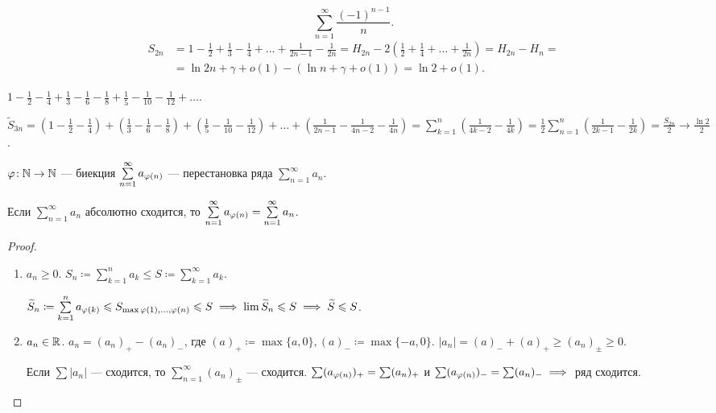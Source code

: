 \begin{example}
    \[
           \sum\limits_{n=1}^\infty \frac{(-1)^{n-1}}{n}
    .\] 
   \begin{align*}
       S_{2n}&=1-\frac{1}{2} + \frac{1}{3} - \frac{1}{4} + \ldots + \frac{1}{2n-1} - \frac{1}{2n} = H_{2n} - 2(\frac{1}{2} + \frac{1}{4} + \ldots + \frac{1}{2n}) = H_{2n} - H_n = \\ 
          &= \ln 2n+ \gamma + o(1) - (\ln n + \gamma + o(1)) = \ln 2 + o(1).
   \end{align*}
\end{example}
\begin{example}
    $1 - \frac{1}{2} - \frac{1}{4} + \frac{1}{3} - \frac{1}{6} - \frac{1}{8} + \frac{1}{5} - \frac{1}{10} - \frac{1}{12} + \ldots$.

    $\widetilde{S}_{3n} = (1 - \frac{1}{2} - \frac{1}{4}) + (\frac{1}{3} - \frac{1}{6} - \frac{1}{8}) + (\frac{1}{5} - \frac{1}{10} - \frac{1}{12}) + \ldots + (\frac{1}{2n - 1} - \frac{1}{4n-2} - \frac{1}{4n}) = \sum\limits_{k=1}^n(\frac{1}{4k - 2} - \frac{1}{4k}) = \frac{1}{2} \sum\limits_{n=1}^n (\frac{1}{2k-1} - \frac{1}{2k}) = \frac{S_{2n}}{2} \to \frac{\ln 2}{2}$.
\end{example}
\begin{definition}
    $\varphi\!: \mathbb{N} \to \mathbb{N}$ --- биекция $\sum\limits_{n=1}^\infty a_{\varphi(n)}$ --- перестановка ряда $\sum\limits_{n=1}^\infty a_n$.
\end{definition}
\begin{theorem}
    Если $\sum\limits_{n=1}^\infty a_n$ абсолютно сходится, то  $\sum\limits_{n=1}^\infty a_{\varphi(n)} = \sum\limits_{n=1}^\infty a_n$.
\end{theorem}
\begin{proof}
    \begin{enumerate}
        \item $a_n \ge 0$. $S_n \coloneqq \sum\limits_{k=1}^n a_k \le S \coloneqq \sum\limits_{k=1}^\infty a_k$.

            $\widetilde{S}_n \coloneqq \sum\limits_{k=1}^n a_{\varphi(k)} \leqslant S_{\max{\varphi(1), \ldots, \varphi(n)}} \leqslant S \implies \lim \widetilde{S}_n \leqslant S \implies \widetilde{S} \leqslant S$.
        \item $a_n \in \mathbb{R}$.  $a_n = (a_n)_+ - (a_n)_-$, где $(a)_+ \coloneqq \max\{a, 0\}, (a)_- \coloneqq \max\{-a, 0\}$.  $|a_n| = (a)_- + (a)_+ \ge (a_n)_\pm \ge 0$.

            Если $\sum |a_n|$ --- сходится, то  $\sum\limits_{n=1}^\infty(a_n)_\pm $ --- сходится.  $\sum (a_{\varphi(n)})_+ = \sum (a_n)_+$ и  $\sum (a_{\varphi(n)})_- = \sum (a_n)_- \implies $ ряд сходится.
    \end{enumerate}
\end{proof}

